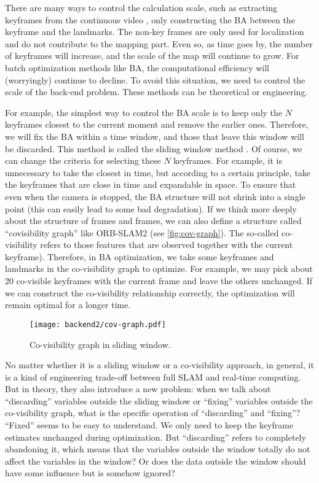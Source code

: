There are many ways to control the calculation scale, such as extracting keyframes from the continuous video \cite{Leutenegger2015}, only constructing the BA between the keyframe and the landmarks. The non-key frames are only used for localization and do not contribute to the mapping part. Even so, as time goes by, the number of keyframes will increase, and the scale of the map will continue to grow. For batch optimization methods like BA, the computational efficiency will (worryingly) continue to decline. To avoid this situation, we need to control the scale of the back-end problem. These methods can be theoretical or engineering.

For example, the simplest way to control the BA scale is to keep only the $N$ keyframes closest to the current moment and remove the earlier ones. Therefore, we will fix the BA within a time window, and those that leave this window will be discarded. This method is called the sliding window method \cite{Sibley2008}. Of course, we can change the criteria for selecting these $N$ keyframes. For example, it is unnecessary to take the closest in time, but according to a certain principle, take the keyframes that are close in time and expandable in space. To ensure that even when the camera is stopped, the BA structure will not shrink into a single point (this can easily lead to some bad degradation). If we think more deeply about the structure of frames and frames, we can also define a structure called ``covisibility graph'' like ORB-SLAM2 \cite{Mur-Artal2015} (see \autoref{fig:cov-graph}). The so-called co-visibility refers to those features that are observed together with the current keyframe). Therefore, in BA optimization, we take some keyframes and landmarks in the co-visibility graph to optimize. For example, we may pick about 20 co-visible keyframes with the current frame and leave the others unchanged. If we can construct the co-visibility relationship correctly, the optimization will remain optimal for a longer time.

\begin{figure}[!ht]
	\centering
	\texttt{[image: backend2/cov-graph.pdf]}
	\caption{Co-visibility graph in sliding window. }
	\label{fig:cov-graph}
\end{figure}

No matter whether it is a sliding window or a co-visibility approach, in general, it is a kind of engineering trade-off between full SLAM and real-time computing. But in theory, they also introduce a new problem: when we talk about ``discarding'' variables outside the sliding window or ``fixing'' variables outside the co-visibility graph, what is the specific operation of ``discarding'' and ``fixing''? ``Fixed'' seems to be easy to understand. We only need to keep the keyframe estimates unchanged during optimization. But ``discarding'' refers to completely abandoning it, which means that the variables outside the window totally do not affect the variables in the window?  Or does the data outside the window should have some influence but is somehow ignored?

